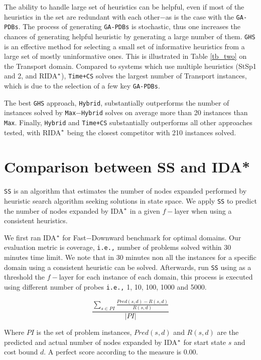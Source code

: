 The ability to handle large set of heuristics can be helpful, even if most of the heuristics in the set are redundant with each other$-$as is the case with the \texttt{GA-PDBs}. The process of generating \texttt{GA-PDBs} is stochastic, thus one increases the chances of generating helpful heuristic by generating a large number of them. \texttt{GHS} is an effective method for selecting a small set of informative heuristics from a large set of mostly uninformative ones. This is illustrated in Table \ref{tb_two} on the Transport domain. Compared to systems which use multiple heuristics (StSp1 and 2, and RIDA$\sp{*}$), \texttt{Time+CS} solves the largest number of Transport instances, which is due to the selection of a few key \texttt{GA-PDBs}.

The best \texttt{GHS} approach, \texttt{Hybrid}, substantially outperforms the number of instances solved by \texttt{Max$-$Hybrid} solves on average more than 20 instances than \texttt{Max}. Finally, \texttt{Hybrid} and \texttt{Time+CS} substantially outperforms all other approaches tested, with RIDA$\sp{*}$ being the closest competitor with 210 instances solved.\\

\section{Comparison between SS and IDA*}
\noindent
\texttt{SS} is an algorithm that estimates the number of nodes expanded performed by heuristic search algorithm seeking solutions in state space. We apply \texttt{SS} to predict the number of nodes expanded by IDA$\sp{*}$ in a given $f-$layer when using a consistent heuristics.

We first ran IDA$\sp{*}$ for Fast$-$Downward benchmark for optimal domains. Our evaluation metric is coverage, \texttt{i.e.,} number of problems solved within 30 minutes time limit. We note that in 30 minutes non all the instances for a specific domain using a consistent heuristic can be solved. Afterwards, run \texttt{SS} using as a threshold the $f-$layer for each instance of each domain, this process is executed using different number of probes \texttt{i.e.,} 1, 10, 100, 1000 and 5000.

\begin{equation}
\frac{\sum_{s\in PI} \frac{Pred(s, d) - R(s, d)}{R(s, d)}}{|PI|}
\label{eq:eq_comparison}
\end{equation}

Where $PI$ is the set of problem instances, $Pred(s,d)$ and $R(s,d)$ are the predicted and actual number of nodes expanded by IDA$\sp{*}$ for start state $s$ and cost bound $d$. A perfect score according to the measure is $0.00$.

